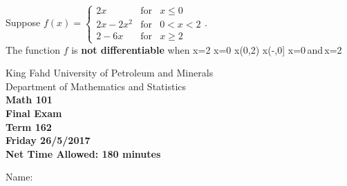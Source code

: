 \documentclass[amsfonts,bezier,leqno,fleqn,12pt,a4paper]{article}
\begin{document}
\begin{large}
\item %
Suppose $f(x)= \left\{\begin{array}{lll} 2x & \mbox{for} & x\leq 0 \\ \displaystyle 2x-2x^2 & \mbox{for} & 0 < x <2\\ 2-6x & \mbox{for} & x\geq 2 \end{array}\right.$.\\ The function $f$ is \textbf{not differentiable} when
\sc
\be
x=2
\ee
\be
x=0
\ee
\be
x\in(0,2)
\ee
\be
x\in(-\infty,0]
\ee
\be
x=0\,\mbox{and}\,x=2
\ee
\newpage



\en

\end{large}

\newpage


\thispagestyle{empty}

\begin{center}
\begin{large}

King Fahd University of Petroleum and Minerals\\
Department of Mathematics and Statistics\\
\vspace*{0.5cm}
{\bf {}} \hfill {\bf Math 101} \hfill {\bf {}} \\
{\bf Final Exam}  \\
{\bf Term 162}  \\
{\bf Friday 26/5/2017}  \\
{\bf Net Time Allowed: 180 minutes}  \\
\vspace*{0.2cm}

\end{large}
\end{center}

\large{Name:  }\hrulefill

\vspace{3mm}
\end{document}
